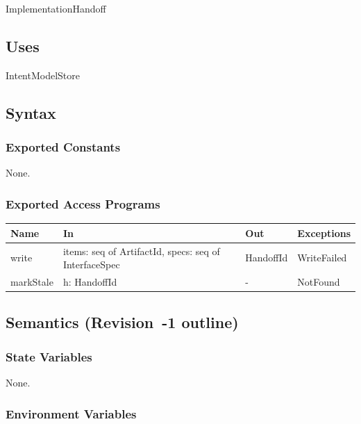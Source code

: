 \documentclass[12pt, titlepage]{article}
\begin{document}
ImplementationHandoff

\subsection{Uses}

IntentModelStore

\subsection{Syntax}

\subsubsection{Exported Constants}

None.

\subsubsection{Exported Access Programs}

\begin{center}
\small
\begin{tabular}{>{\raggedright\arraybackslash}p{3.7cm} >{\raggedright\arraybackslash}p{3.8cm} >{\raggedright\arraybackslash}p{3.6cm} >{\raggedright\arraybackslash}p{3.7cm}}
\hline
\textbf{Name} & \textbf{In} & \textbf{Out} & \textbf{Exceptions} \\
\hline
write & items: seq of ArtifactId, specs: seq of InterfaceSpec & HandoffId & WriteFailed \\
markStale & h: HandoffId & - & NotFound \\
\hline
\end{tabular}
\end{center}

\subsection{Semantics (Revision~-1 outline)}

\subsubsection{State Variables}

None.

\subsubsection{Environment Variables}
\end{document}
